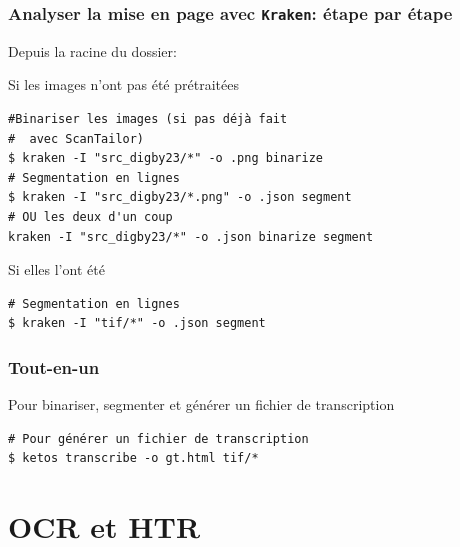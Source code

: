 \documentclass[10pt, compress,urlcolor=blue]{beamer}
\begin{document}
\begin{frame}[fragile]
\frametitle{Analyser la mise en page avec \texttt{Kraken}: étape par étape}
    Depuis la racine du dossier:
\begin{block}{\alert{Si les images n'ont pas été prétraitées}}

\end{block}
\begin{verbatim}
#Binariser les images (si pas déjà fait
#  avec ScanTailor)
$ kraken -I "src_digby23/*" -o .png binarize
# Segmentation en lignes
$ kraken -I "src_digby23/*.png" -o .json segment
# OU les deux d'un coup
kraken -I "src_digby23/*" -o .json binarize segment
\end{verbatim}

\begin{block}{\alert{Si elles l'ont été}}
\begin{verbatim}
# Segmentation en lignes
$ kraken -I "tif/*" -o .json segment
\end{verbatim}
\end{block}

\end{frame}


\begin{frame}[fragile]
\frametitle{Tout-en-un}

Pour binariser, segmenter et générer un fichier de transcription

\begin{verbatim}
# Pour générer un fichier de transcription
$ ketos transcribe -o gt.html tif/*
\end{verbatim}
    
\end{frame}

\section{OCR et HTR}
\end{document}
